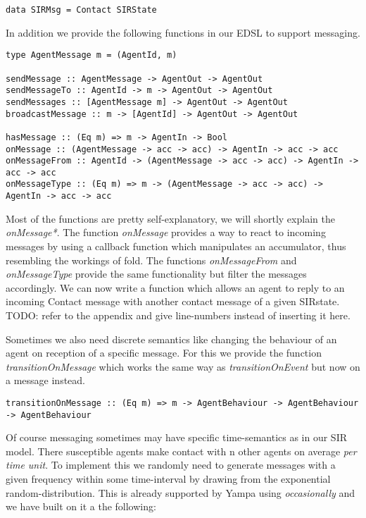 \begin{verbatim}
data SIRMsg = Contact SIRState
\end{verbatim}

In addition we provide the following functions in our EDSL to support messaging.

\begin{verbatim}
type AgentMessage m = (AgentId, m)

sendMessage :: AgentMessage -> AgentOut -> AgentOut
sendMessageTo :: AgentId -> m -> AgentOut -> AgentOut
sendMessages :: [AgentMessage m] -> AgentOut -> AgentOut
broadcastMessage :: m -> [AgentId] -> AgentOut -> AgentOut

hasMessage :: (Eq m) => m -> AgentIn -> Bool
onMessage :: (AgentMessage -> acc -> acc) -> AgentIn -> acc -> acc
onMessageFrom :: AgentId -> (AgentMessage -> acc -> acc) -> AgentIn -> acc -> acc
onMessageType :: (Eq m) => m -> (AgentMessage -> acc -> acc) -> AgentIn -> acc -> acc
\end{verbatim}

Most of the functions are pretty self-explanatory, we will shortly explain the \textit{onMessage*}. The function \textit{onMessage} provides a way to react to incoming messages by using a callback function which manipulates an accumulator, thus resembling the workings of fold. The functions \textit{onMessageFrom} and \textit{onMessageType} provide the same functionality but filter the messages accordingly. We can now write a function which allows an agent to reply to an incoming Contact message with another contact message of a given SIRstate. TODO: refer to the appendix and give line-numbers instead of inserting it here.

Sometimes we also need discrete semantics like changing the behaviour of an agent on reception of a specific message. For this we provide the function \textit{transitionOnMessage} which works the same way as \textit{transitionOnEvent} but now on a message instead.

\begin{verbatim}
transitionOnMessage :: (Eq m) => m -> AgentBehaviour -> AgentBehaviour -> AgentBehaviour
\end{verbatim}

Of course messaging sometimes may have specific time-semantics as in our SIR model. There susceptible agents make contact with n other agents on average \textit{per time unit}. To implement this we randomly need to generate messages with a given frequency within some time-interval by drawing from the exponential random-distribution. This is already supported by Yampa using \textit{occasionally} and we have built on it a the following:

